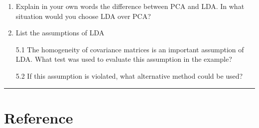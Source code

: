\documentclass[
]{book}
\begin{document}
\begin{enumerate}
\def\labelenumi{\arabic{enumi}.}
\setcounter{enumi}{3}
\item
  Explain in your own words the difference between PCA and LDA. In what situation would you choose LDA over PCA?
\item
  List the assumptions of LDA

  5.1 The homogeneity of covariance matrices is an important assumption of LDA. What test was used to evaluate this assumption in the example?

  5.2 If this assumption is violated, what alternative method could be used?
\end{enumerate}

\begin{center}\rule{0.5\linewidth}{0.5pt}\end{center}

\section{Reference}\label{reference-1}


\end{document}
